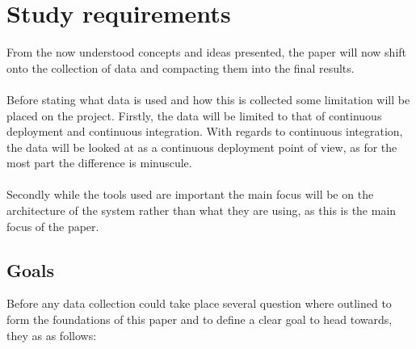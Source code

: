 %
%
%
%
%
%

\section{Study requirements}

From the now understood concepts and ideas presented, the paper will now shift onto the collection of data and compacting them into the final results. 
\\\\
Before stating what data is used and how this is collected some limitation will be placed on the project. Firstly, the data will be limited to that of continuous deployment and continuous integration. With regards to continuous integration, the data will be looked at as a continuous deployment point of view, as for the most part the difference is minuscule.
\\\\
Secondly while the tools used are important the main focus will be on the architecture of the system rather than what they are using, as this is the main focus of the paper.

\subsection{Goals}

Before any data collection could take place several question where outlined to form the foundations of this paper and to define a clear goal to head towards, they as as follows:

